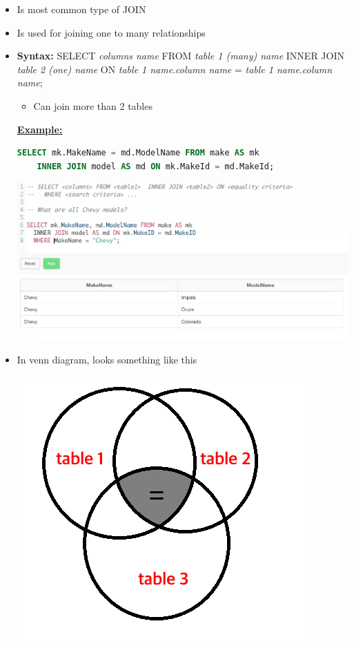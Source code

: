 \documentclass[12pt]{article}
\begin{document}
\bigskip

\begin{itemize}
    \item Is most common type of JOIN
    \item Is used for joining one to many relationships
    \item \textbf{Syntax:} SELECT \textit{columns name} FROM \textit{table 1 (many) name}
    INNER JOIN \textit{table 2 (one) name} ON \textit{table 1 name}.\textit{column name} = \textit{table 1 name}.\textit{column name};
    \begin{itemize}
        \item Can join more than 2 tables
    \end{itemize}

    \bigskip

    \underline{\textbf{Example:}}

    \bigskip

    \begin{lstlisting}[language=SQL]
    SELECT mk.MakeName = md.ModelName FROM make AS mk
    INNER JOIN model AS md ON mk.MakeId = md.MakeId;
    \end{lstlisting}

    \bigskip

    \begin{center}
    \includegraphics[width=0.8\linewidth]{images/part_4_notes_2.png}
    \end{center}

    \item In venn diagram, looks something like this

    \begin{center}
    \includegraphics[width=0.4\linewidth]{images/part_4_notes_4.png}
    \end{center}
\end{itemize}
\end{document}
